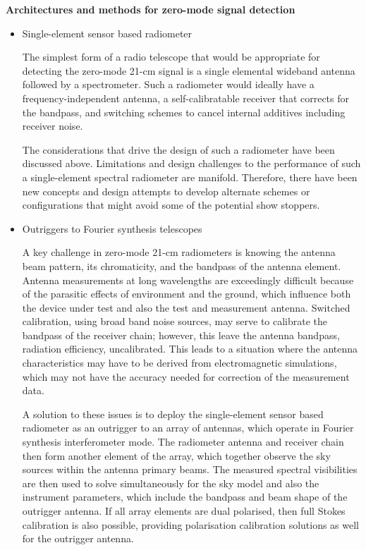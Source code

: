 \textbf{Architectures and methods for zero-mode signal detection}

\begin{itemize}
\item
  Single-element sensor based radiometer
  
  The simplest form of a radio telescope that would be appropriate for detecting the zero-mode 21-cm signal is a single elemental wideband antenna followed by a spectrometer.  Such a radiometer would ideally have a frequency-independent antenna, a self-calibratable receiver that corrects for the bandpass, and switching schemes to cancel internal additives including receiver noise.
  
  The considerations that drive the design of such a radiometer have been discussed above.  Limitations and design challenges to the performance of such a single-element spectral radiometer are manifold.  Therefore, there have been new concepts and design attempts to develop alternate schemes or configurations that might avoid some of the potential show stoppers.
  
\item
  Outriggers to Fourier synthesis telescopes
  
  A key challenge in zero-mode 21-cm radiometers is knowing the antenna beam pattern, its chromaticity, and the bandpass of the antenna element.  Antenna measurements at long wavelengths are exceedingly difficult because of the parasitic effects of environment and the ground, which influence both the device under test and also the test and measurement antenna.  Switched calibration, using broad band noise sources, may serve to calibrate the bandpass of the receiver chain; however, this leave the antenna bandpass, radiation efficiency, uncalibrated.  This leads to a situation where the antenna characteristics may have to be derived from electromagnetic simulations, which may not have the accuracy needed for correction of the measurement data.
  
  A solution to these issues is to deploy the single-element sensor based radiometer as an outrigger to an array of antennas, which operate in Fourier synthesis interferometer mode.  The radiometer antenna and receiver chain then form another element of the array, which together observe the sky sources within the antenna primary beams.  The measured spectral visibilities are then used to solve simultaneously for the sky model and also the instrument parameters, which include the bandpass and beam shape of the outrigger antenna. If all array elements are dual polarised, then full Stokes calibration is also possible, providing polarisation calibration solutions as well for the outrigger antenna.
  

\end{itemize}
